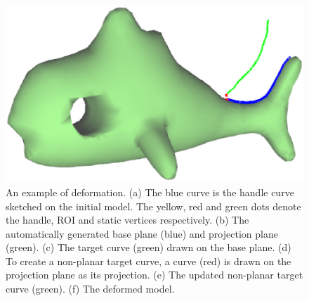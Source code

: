\begin{figure} [htbp]
{    \begin{minipage}[b]{0.3\textwidth}
      \centering
      \includegraphics[scale=0.15]{figs/f3.fish-deform-5.eps}
    \end{minipage}}
  \caption{An example of deformation.
  (a) The blue curve is the handle curve sketched on the initial model.
  The yellow, red and green dots denote the handle, ROI and static vertices respectively.
  (b) The automatically generated base plane (blue) and projection plane (green).
  (c) The target curve (green) drawn on the base plane.
  (d) To create a non-planar target curve, a curve (red) is drawn on the projection plane as its
  projection.
  (e) The updated non-planar target curve (green).
  (f) The deformed model.}
  \label{fig:deform} %
\end{figure}

